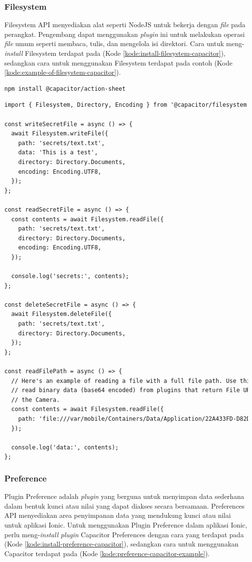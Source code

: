 \subsubsection{Filesystem}
Filesystem API menyediakan alat seperti NodeJS untuk bekerja dengan \textit{file} pada perangkat. Pengembang dapat menggunakan \textit{plugin} ini untuk melakukan operasi \textit{file} umum seperti membaca, tulis, dan mengelola isi direktori. Cara untuk meng-\textit{install} Filesystem terdapat pada (Kode \ref{kode:install-filesystem-capacitor}), sedangkan cara untuk menggunakan Filesystem terdapat pada contoh (Kode \ref{kode:example-of-filesystem-capacitor}).

\begin{lstlisting}[language=HTML, caption=Kode untuk Menginstal Plugin Filesystem, label=kode:install-filesystem-capacitor]
npm install @capacitor/action-sheet
\end{lstlisting}

\begin{lstlisting}[language=HTML, caption=Contoh Kode Penggunaan Filesystem, label=kode:example-of-filesystem-capacitor]
import { Filesystem, Directory, Encoding } from '@capacitor/filesystem';

const writeSecretFile = async () => {
  await Filesystem.writeFile({
    path: 'secrets/text.txt',
    data: 'This is a test',
    directory: Directory.Documents,
    encoding: Encoding.UTF8,
  });
};

const readSecretFile = async () => {
  const contents = await Filesystem.readFile({
    path: 'secrets/text.txt',
    directory: Directory.Documents,
    encoding: Encoding.UTF8,
  });

  console.log('secrets:', contents);
};

const deleteSecretFile = async () => {
  await Filesystem.deleteFile({
    path: 'secrets/text.txt',
    directory: Directory.Documents,
  });
};

const readFilePath = async () => {
  // Here's an example of reading a file with a full file path. Use this to
  // read binary data (base64 encoded) from plugins that return File URIs, such as
  // the Camera.
  const contents = await Filesystem.readFile({
    path: 'file:///var/mobile/Containers/Data/Application/22A433FD-D82D-4989-8BE6-9FC49DEA20BB/Documents/text.txt',
  });

  console.log('data:', contents);
};
\end{lstlisting}

\subsubsection{Preference}
Plugin Preference adalah \textit{plugin} yang berguna untuk menyimpan data sederhana dalam bentuk kunci atau nilai yang dapat diakses secara bersamaan. Preferences API menyediakan area penyimpanan data yang mendukung kunci atau nilai untuk aplikasi Ionic. Untuk menggunakan Plugin Preference dalam aplikasi Ionic, perlu meng-\textit{install plugin} Capacitor Preferences dengan cara yang terdapat pada (Kode \ref{kode:install-preference-capacitor}), sedangkan cara untuk menggunakan Capacitor terdapat pada (Kode \ref{kode:preference-capacitor-example}).

